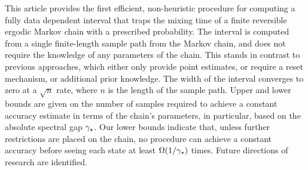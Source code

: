 This article provides the first efficient, non-heuristic procedure for computing a fully data dependent interval
that traps the mixing time of a finite reversible ergodic Markov chain with a prescribed probability.
The interval is computed from a single finite-length sample
path from the Markov chain, and does not require the 
knowledge of any parameters of the chain.
This stands in contrast to previous approaches, which either 
only provide point estimates, or require a
reset mechanism, or additional prior knowledge.
The width of the interval converges to zero at a
$\sqrt{n}$ rate, where $n$ is the length of the sample path.
Upper and lower bounds are given on the number of samples required
to achieve a constant accuracy estimate in terms of the chain's parameters,
in particular, based on the absolute spectral gap $\gamma_{\star}$.
Our lower bounds indicate that, 
unless further restrictions are placed on the chain,
no procedure can achieve a constant
accuracy before seeing each state at least  $\Omega(1/\gamma_{\star})$ times.
Future directions of research are identified.


%
%
